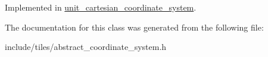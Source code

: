 Implemented in \hyperlink{classunit__cartesian__coordinate__system_a96d70a42cec4279c1320995e770c3fe5}{unit\-\_\-cartesian\-\_\-coordinate\-\_\-system}.



The documentation for this class was generated from the following file\-:\begin{DoxyCompactItemize}
\item 
include/tiles/abstract\-\_\-coordinate\-\_\-system.\-h\end{DoxyCompactItemize}

